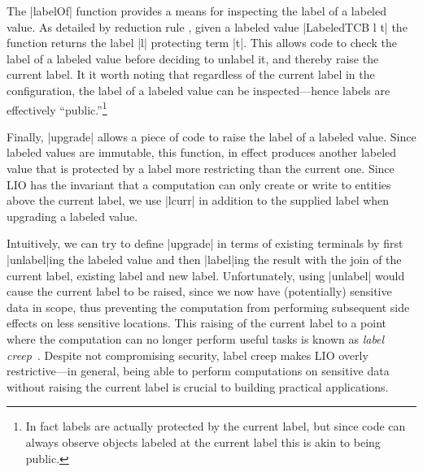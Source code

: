 The |labelOf| function provides a means for inspecting the label of a
labeled value.
%
As detailed by reduction rule , given a labeled value
|LabeledTCB l t| the function returns the label |l| protecting term
|t|.
%
This allows code to check the label of a labeled value before deciding
to unlabel it, and thereby raise the current label.
%
It it worth noting that regardless of the current label in the
configuration, the label of a labeled value can be inspected---hence
labels are effectively ``public.''\footnote{
In fact labels are actually protected by the current label, but since
code can always observe objects labeled at the current label this is
akin to being public.
}

Finally, |upgrade| allows a piece of code to raise the label of a
labeled value.
%
Since labeled values are immutable, this function, in effect produces
another labeled value that is protected by a label more restricting
than the current one.
%
Since LIO has the invariant that a computation can only create or
write to entities above the current label, we use |lcurr| in addition
to the supplied label when upgrading a labeled value.

Intuitively, we can try to define |upgrade| in terms of existing
terminals by first |unlabel|ing the labeled value and then |label|ing
the result with the join of the current label, existing label and new
label.
%
Unfortunately, using |unlabel| would cause the current label to be
raised, since we now have (potentially) sensitive data in scope, thus
preventing the computation from performing subsequent side effects on
less sensitive locations.
%
%
This raising of the current label to a point where the computation can
no longer perform useful tasks is known as \emph{label
creep}~\cite{sabelfeld:language-based-iflow}.
%
%
Despite not compromising security, label creep makes LIO overly
restrictive---in general, being able to perform computations on
sensitive data without raising the current label is crucial to
building practical applications.

